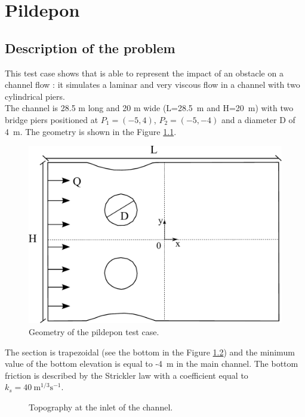 \chapter{Pildepon}
%
%
\section{Description of the problem}
This test case shows that  is able to represent the impact of an obstacle on a channel flow : it simulates a laminar and very viscous flow in a channel with two cylindrical piers. \\
The channel is 28.5 m long and 20 m wide (L=28.5~m and H=20~m) with two bridge piers positioned at $P_1=(-5,4)$, $P_2=(-5,-4)$ and a diameter D of 4~m.
The geometry is shown in the Figure \ref{fig:geo:bridge}.
\begin{figure}[H]
 \centering
 \includegraphics[scale=0.3]{img/geometry.pdf}
 \caption{Geometry of the pildepon test case.}
 \label{fig:geo:bridge}
\end{figure}
The section is trapezoidal (see the bottom in the Figure \ref{fig:bott:bridge}) and the minimum value of the bottom elevation is equal to -4~m in the main channel.
The bottom friction is described by the Strickler law with a coefficient equal to $k_s=40~\text{m}^{1/3}\text{s}^{-1}$.
\begin{figure}[H]
 \centering
 \caption{Topography at the inlet of the channel.}
 \label{fig:bott:bridge}
\end{figure}
